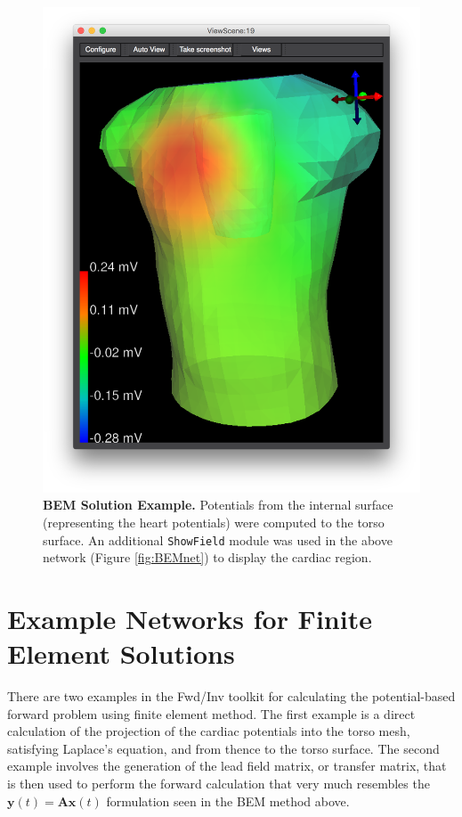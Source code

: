 \begin{figure}[H]
\begin{center}
\includegraphics[width=.9\textwidth]{ECGToolkitGuide_figures/BEMSolution.png}
\caption{{\bf BEM Solution Example.} Potentials from the internal surface (representing the heart potentials) were computed to the torso surface. An additional {\tt ShowField} module was used in the above network (Figure \ref{fig:BEMnet}) to display the cardiac region.}
\label{fig:BEMsol}
\end{center}
\vspace{-.25in}
\end{figure}

\newpage

\section{Example Networks for Finite Element Solutions}

There are two examples in the Fwd/Inv toolkit for calculating the potential-based forward problem using finite element method. The first example is a direct calculation of the projection of the cardiac potentials into the torso mesh, satisfying Laplace's equation, and from thence to the torso surface.
The second example involves the generation of the lead field matrix, or transfer matrix, that is then used  to perform the forward calculation that very much resembles the $\mathbf{y}(t) = \mathbf{A}\mathbf{x}(t)$ formulation seen in the BEM method above.

